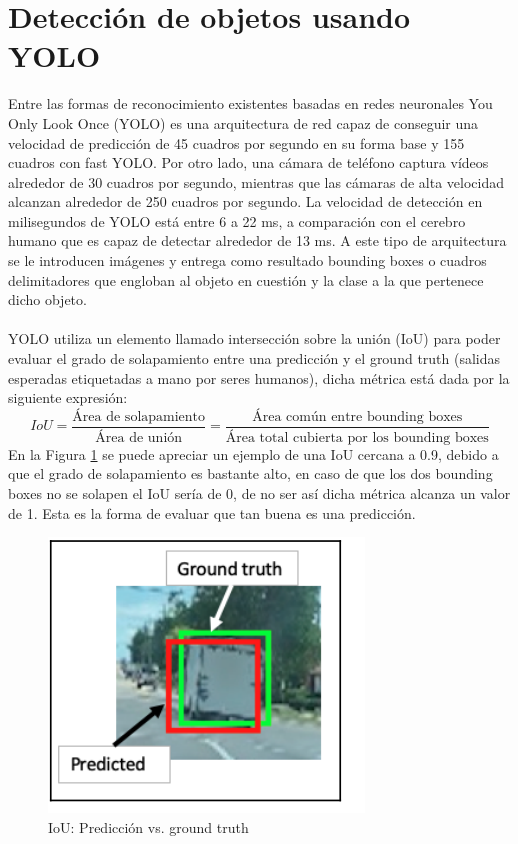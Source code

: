 \section{Detección de objetos usando YOLO}
Entre las formas de reconocimiento existentes basadas en redes neuronales You Only Look Once (YOLO) es una arquitectura de red capaz de conseguir una velocidad de predicción de 45 cuadros por segundo en su forma base y 155 cuadros con fast YOLO. Por otro lado, una cámara de teléfono captura vídeos alrededor de 30 cuadros por segundo, mientras que las cámaras de alta velocidad alcanzan alrededor de 250 cuadros por segundo. La velocidad de detección en milisegundos de YOLO está entre 6 a 22 ms, a comparación con el cerebro humano que es capaz de detectar alrededor de 13 ms. A este tipo de arquitectura se le introducen imágenes y entrega como resultado bounding boxes o cuadros delimitadores que engloban al objeto en cuestión y la clase a la que pertenece dicho objeto.
\\
\\
YOLO utiliza un elemento llamado intersección sobre la unión (IoU) para poder evaluar el grado de solapamiento entre una predicción y el ground truth (salidas esperadas etiquetadas a mano por seres humanos), dicha métrica está dada por la siguiente expresión: 
\begin{equation}
    IoU = \frac{\text{Área de solapamiento}}{\text{Área de unión}} = \frac{\text{Área común entre bounding boxes}}{\text{Área total cubierta por los bounding boxes}}
\end{equation}
En la Figura \ref{IoU} se puede apreciar un ejemplo de una IoU cercana a 0.9, debido a que el grado de solapamiento es bastante alto, en caso de que los dos bounding boxes no se solapen el IoU sería de 0, de no ser así dicha métrica alcanza un valor de 1. Esta es la forma de evaluar que tan buena es una predicción.
\begin{figure}[H]
    \centering
    \includegraphics{Recursos/iou.png}
    \caption{IoU: Predicción vs. ground truth}
    \label{IoU}
\end{figure}
